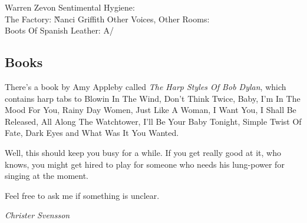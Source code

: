 \documentclass[a4paper,twoside]{memoir}
\begin{document}
Warren Zevon Sentimental Hygiene: \\ The Factory: \G


Nanci Griffith Other Voices, Other Rooms: \\ Boots Of Spanish
Leather: A/\D
\subsection*{Books }

There's a book by Amy Appleby called \emph{The Harp Styles Of Bob
Dylan}, which contains harp tabs to Blowin In The Wind, Don't Think
Twice, Baby, I'm In The Mood For You, Rainy Day Women, Just Like A
Woman, I Want You, I Shall Be Released, All Along The Watchtower, I'll
Be Your Baby Tonight, Simple Twist Of Fate, Dark Eyes and What Was It
You Wanted.

\hrulefill

Well, this should keep you busy for a while. If you get really good
at it, who knows, you might get hired to play for someone who needs
his lung-power for singing at the moment.

Feel free to ask me if something is unclear.

\emph{Christer Svensson}
\end{document}
